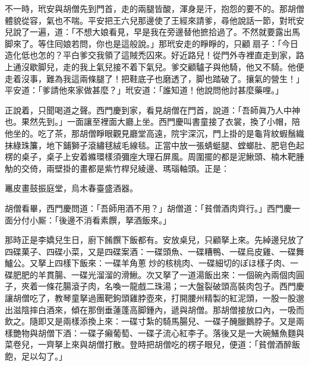 不一時，玳安與胡僧先到門首，走的兩腿皆酸，渾身是汗，抱怨的要不的。那胡僧體貌從容，氣也不喘。平安把王六兒那邊使了王經來請爹，尋他說話一節，對玳安兒說了一遍，道：「不想大娘看見，早是我在旁邊替他摭拾過了。不然就要露出馬脚來了。等住囘娘若問，你也是這般說。」那玳安走的睜睜的，只顧𢵞扇子：「今日造化低也怎的？平白爹交我領了這賊禿囚來。好近路兒！從門外寺裡直走到家，路上通沒歇脚兒，走的我上氣兒接不着下氣兒。爹交顧驢子與他騎，他又不騎。他便走着沒事，難為我這兩條腿了！把鞋底子也磨透了，脚也踏破了。攘氣的營生！」平安道：「爹請他來家做甚麼？」玳安道：「誰知道！他說問他討甚麼藥哩。」

正說着，只聞喝道之聲。西門慶到家，看見胡僧在門首，說道：「吾師眞乃人中神也。果然先到。」一面讓至裡面大廳上坐。西門慶叫書童接了衣裳，換了小帽，陪他坐的。吃了茶，那胡僧睜眼觀見廳堂高遠，院宇深沉，門上掛的是龜背紋蝦鬚織抹綠珠簾，地下鋪獅子滾繡毬絨毛線毯。正當中放一張蜻蜓腿、螳螂肚、肥皂色起楞的桌子，桌子上安着縧環樣須彌座大理石屏風。周圍擺的都是泥鰍頭、楠木靶腫觔的交倚，兩壁掛的畫都是紫竹桿兒綾邊、瑪瑙軸頭。{}正是：

\begin{myquote} 
鼉皮畫鼓振庭堂，烏木春臺盛酒器。
\end{myquote} 

胡僧看畢，西門慶問道：「吾師用酒不用？」胡僧道：「貧僧酒肉齊行。」西門慶一面分付小厮：「後邊不消看素饌，拏酒飯來。」

那時正是李嬌兒生日，廚下餚饌下飯都有。安放桌兒，只顧拏上來。先綽邊兒放了四碟菓子、四碟小菜，又是四碟案酒：一碟頭魚、一碟糟鴨、一碟烏皮雞、一碟舞鱸公。又拏上四樣下飯來：一碟羊角蔥𤆑炒的核桃肉、一碟細切的ぽほ樣子肉、一碟肥肥的羊貫腸、一碟光溜溜的滑鰍。次又拏了一道湯飯出來：一個碗內兩個肉圓子，夾着一條花腸滾子肉，名喚一龍戲二珠湯；一大盤裂破頭高裝肉包子。西門慶讓胡僧吃了，教琴童拏過團靶鉤頭雞脖壺來，打開腰州精製的紅泥頭，一股一股邈出滋陰摔白酒來，傾在那倒垂蓮蓬高脚鍾內，遞與胡僧。那胡僧接放口內，一吸而飲之。隨即又是兩樣添換上來：一碟寸紮的騎馬腸兒、一碟子醃臘鵝脖子。又是兩樣艷物與胡僧下酒：一碟子癩葡萄、一碟子流心紅李子。落後又是一大碗鱔魚麵與菜卷兒，一齊拏上來與胡僧打散。登時把胡僧吃的楞子眼兒，便道：「貧僧酒醉飯飽，足以勾了。」

